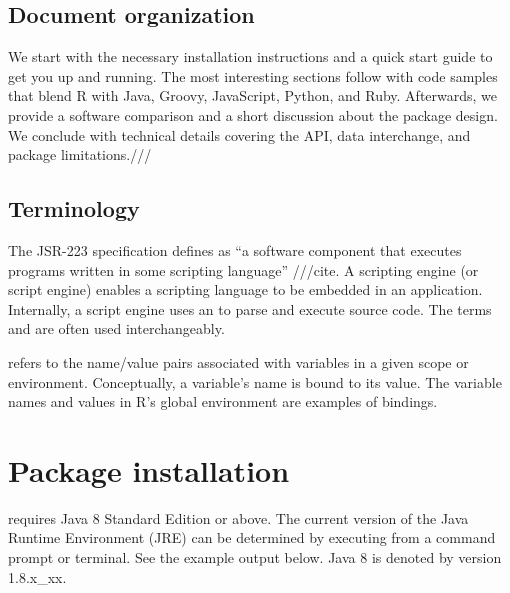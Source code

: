 

\subsection{Document organization}

We start with the necessary installation instructions and a quick start guide to get you up and running. The most interesting sections follow with code samples that blend R with Java, Groovy, JavaScript, Python, and Ruby. Afterwards, we provide a software comparison and a short discussion about the  package design. We conclude with technical details covering the  API, data interchange, and package limitations.///

\subsection{Terminology}

The JSR-223 specification defines  as “a software component that executes programs written in some scripting language” ///cite. A scripting engine (or script engine) enables a scripting language to be embedded in an application. Internally, a script engine uses an  to parse and execute source code. The terms  and  are often used interchangeably.

 refers to the name/value pairs associated with variables in a given scope or environment. Conceptually, a variable's name is bound to its value. The variable names and values in R's global environment are examples of bindings.

\section{Package installation}

 requires Java 8 Standard Edition or above. The current version of the Java Runtime Environment (JRE) can be determined by executing  from a command prompt or terminal. See the example output below.  Java 8 is denoted by version 1.8.x\_xx.

